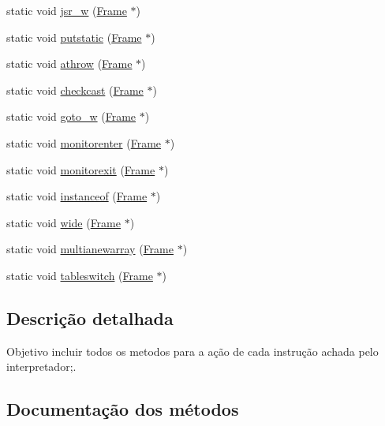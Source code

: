 \begin{DoxyCompactItemize}
\item 
static void \hyperlink{class_instruction_impl_ab9e24de0102f19dd84fd78d9d6bb9f21}{jsr\+\_\+w} (\hyperlink{struct_frame}{Frame} $\ast$)
\item 
static void \hyperlink{class_instruction_impl_a67fc568729a38dbd86f24667b928d440}{putstatic} (\hyperlink{struct_frame}{Frame} $\ast$)
\item 
static void \hyperlink{class_instruction_impl_a6d930daf9428f86993e14d24c38623c6}{athrow} (\hyperlink{struct_frame}{Frame} $\ast$)
\item 
static void \hyperlink{class_instruction_impl_a5139066782aa2227dc4c04876cdb14e2}{checkcast} (\hyperlink{struct_frame}{Frame} $\ast$)
\item 
static void \hyperlink{class_instruction_impl_a994c8fe4537365f45431a31bee553035}{goto\+\_\+w} (\hyperlink{struct_frame}{Frame} $\ast$)
\item 
static void \hyperlink{class_instruction_impl_ab71170e33262cb98957e70eb59d270c1}{monitorenter} (\hyperlink{struct_frame}{Frame} $\ast$)
\item 
static void \hyperlink{class_instruction_impl_a57ddfffe6adfd2c57fcea5d510554d57}{monitorexit} (\hyperlink{struct_frame}{Frame} $\ast$)
\item 
static void \hyperlink{class_instruction_impl_a6a0f0358baf22b30222d3bd476c2c5e5}{instanceof} (\hyperlink{struct_frame}{Frame} $\ast$)
\item 
static void \hyperlink{class_instruction_impl_af113b7ce37e5617c4f8a37fd63c2be7d}{wide} (\hyperlink{struct_frame}{Frame} $\ast$)
\item 
static void \hyperlink{class_instruction_impl_a411341be01a2f7c4a271ff5f91dc713d}{multianewarray} (\hyperlink{struct_frame}{Frame} $\ast$)
\item 
static void \hyperlink{class_instruction_impl_aac6c771f95ef1ab1d02da1a18ad68b26}{tableswitch} (\hyperlink{struct_frame}{Frame} $\ast$)
\end{DoxyCompactItemize}


\subsection{Descrição detalhada}
Objetivo incluir todos os metodos para a ação de cada instrução achada pelo interpretador;. 

\subsection{Documentação dos métodos}
